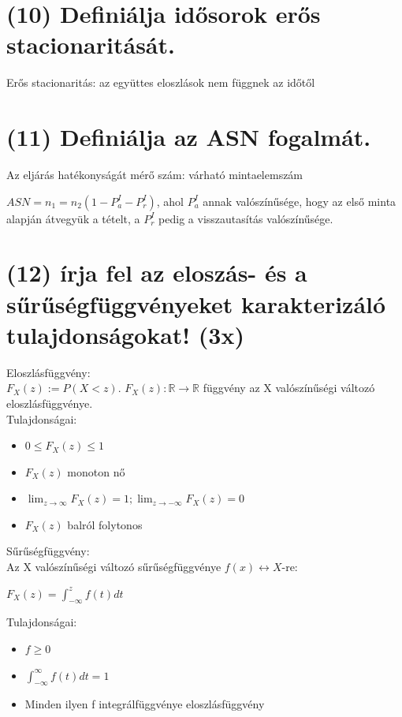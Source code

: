 \documentclass[12p]{article}
\begin{document}
\section{(10) Definiálja idősorok erős stacionaritását.}

Erős stacionaritás: az együttes eloszlások nem
függnek az időtől

\section{(11) Definiálja az ASN fogalmát.}

Az eljárás hatékonyságát mérő szám: várható mintaelemszám

$ASN = n_1 = n_2(1 - P^{I}_a - P^I_r)$, ahol $P_a^I$ annak valószínűsége, hogy az első minta alapján átvegyük a tételt, a $P_r^I$ pedig a visszautasítás valószínűsége.

\section{(12) írja fel az eloszás- és a sűrűségfüggvényeket karakterizáló tulajdonságokat! (3x)}

Eloszlásfüggvény:\\
$F_X(z):=P(X<z)$. $F_X(z):\mathbb{R}\rightarrow\mathbb{R}$ függvény az X valószínűségi változó eloszlásfüggvénye.\\
Tulajdonságai:

\begin{itemize}
	\item $0 \leq F_X(z) \leq 1$
	\item $F_X(z)$ monoton nő
	\item $\lim_{z \rightarrow \infty} F_X(z) = 1; \lim_{z \rightarrow -\infty} F_X(z) = 0$
	\item $F_X(z)$ balról folytonos
\end{itemize}

Sűrűségfüggvény:\\
Az X valószínűségi változó sűrűségfüggvénye $f(x) \leftrightarrow X$-re:

$F_X(z) = \int_{-\infty}^z f(t) dt$

Tulajdonságai:
\begin{itemize}
	\item $f \geq 0$
	\item $\int_{-\infty}^{\infty} f(t) dt = 1$
	\item Minden ilyen f integrálfüggvénye eloszlásfüggvény
\end{itemize}
\end{document}
